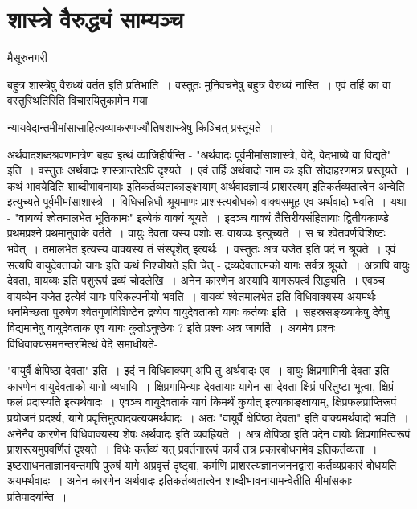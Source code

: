 {\fontsize{15}{17}\selectfont
\chapter{शास्त्रे वैरुद्ध्यं साम्यञ्च} 

\begin{center}
\smallskip

मैसूरुनगरी
\addrule
\end{center}

बहुत्र शास्त्रेषु वैरुध्यं वर्तत इति प्रतिभाति~। वस्तुतः मुनिवचनेषु बहुत्र वैरुध्यं नास्ति~। एवं तर्हि का वा वस्तुस्थितिरिति विचारयितुकामेन मया  

न्यायवेदान्तमीमांसासाहित्यव्याकरणज्यौतिषशास्त्रेषु किञ्चित् प्रस्तूयते~। 

अर्थवादशब्दश्रवणमात्रेण बहव इत्थं व्याजिहीर्षन्ति - "अर्थवादः पूर्वमीमांसाशास्त्रे, वेदे, वेदभाष्ये वा विद्यते" इति~। वस्तुतः अर्थवादः शास्त्रान्तरेऽपि दृश्यते~। एवं तर्हि अर्थवादो नाम कः इति सोदाहरणमत्र प्रस्तूयते~। कथं भावयेदिति शाब्दीभावनायाः इतिकर्तव्यताकाङ्क्षायाम् अर्थवादज्ञाप्यं प्राशस्त्यम् इतिकर्तव्यतात्वेन अन्वेति इत्युच्यते पूर्वमीमांसाशास्त्रे~। विधिसन्निधौ श्रूयमाणः प्राशस्त्यबोधको वाक्यसमूह एव अर्थवादो भवति~। यथा - "वायव्यं श्वेतमालभेत भूतिकामः" इत्येकं वाक्यं श्रूयते~। इदञ्च वाक्यं तैत्तिरीयसंहितायाः द्वितीयकाण्डे प्रथमप्रश्ने प्रथमानुवाके वर्तते~। वायुः देवता यस्य पशोः सः वायव्यः इत्युच्यते~। स च श्वेतवर्णविशिष्टः भवेत्~। तमालभेत इत्यस्य वाक्यस्य तं संस्पृशेत् इत्यर्थः~। वस्तुतः अत्र यजेत इति पदं न श्रूयते~। एवं सत्यपि वायुदेवताको यागः इति कथं निश्चीयते इति चेत् - द्रव्यदेवतात्मको यागः सर्वत्र श्रूयते~। अत्रापि वायुः देवता, वायव्यः इति पशुरूपं द्रव्यं चोदलेखि~। अनेन कारणेन अस्यापि यागरूपत्वं सिद्ध्यति~। एवञ्च वायव्येन यजेत इत्येवं यागः परिकल्पनीयो भवति~। वायव्यं श्वेतमालभेत इति विधिवाक्यस्य अयमर्थः - धनमिच्छता पुरुषेण श्वेतगुणविशिष्टेन द्रव्येण वायुदेवताको यागः कर्तव्यः इति~। सहस्रसङ्ख्याकेषु देवेषु विद्यमानेषु वायुदेवताक एव यागः कुतोऽनुष्ठेयः ? इति प्रश्नः अत्र जागर्ति~। अयमेव प्रश्नः विधिवाक्यसमनन्तरमित्थं वेदे समाधीयते-

"वायुर्वै क्षेपिष्ठा देवता" इति~। इदं न विधिवाक्यम् अपि तु अर्थवादः एव~। वायुः क्षिप्रगामिनी देवता इति कारणेन वायुदेवताको यागो व्यधायि~। क्षिप्रगामिन्याः देवतायाः यागेन सा देवता क्षिप्रं परितुष्टा भूत्वा, क्षिप्रं फलं प्रदास्यति इत्यर्थवादः~। एवञ्च वायुदेवताकं यागं किमर्थं कुर्यात् इत्याकाङ्क्षायाम्, क्षिप्रफलप्राप्तिरूपं प्रयोजनं प्रदर्श्य, यागे प्रवृत्तिमुत्पादयत्ययमर्थवादः~। अतः "वायुर्वै क्षेपिष्ठा देवता" इति वाक्यमर्थवादो भवति~। अनेनैव कारणेन  विधिवाक्यस्य शेषः अर्थवादः इति व्यवह्रियते~। अत्र क्षेपिष्ठा इति पदेन वायोः क्षिप्रगामित्वरूपं प्राशस्त्यमुपवर्णितं दृश्यते~। विधेः कर्तव्यं यत् प्रवर्तनारूपं कार्यं तत्र प्रकारबोधनमेव इतिकर्तव्यता~। इष्टसाधनताज्ञानवन्तमपि पुरुषं यागे अप्रवृत्तं दृष्ट्वा, कर्मणि प्राशस्त्यज्ञानजननद्वारा कर्तव्यप्रकारं बोधयति अयमर्थवादः~। अनेन कारणेन अर्थवादः इतिकर्तव्यतात्वेन शाब्दीभावनायामन्वेतीति मीमांसकाः प्रतिपादयन्ति~। 

}
